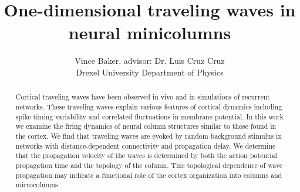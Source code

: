 \documentclass[a4paper,11pt]{article}
\title{One-dimensional traveling waves in neural minicolumns}
\author{Vince Baker, advisor: Dr. Luis Cruz Cruz\\ Drexel University Department of Physics}
\begin{document}
\maketitle

\begin{abstract}
Cortical traveling waves have been observed in vivo and in simulations of recurrent networks.
These traveling waves explain various features of cortical dynamics including spike timing variability and correlated fluctuations in membrane potential.
In this work we examine the firing dynamics of neural column structures similar to those found in the cortex.
We find that traveling waves are evoked by random background stimulus in networks with distance-dependent connectivity and propagation delay.
We determine that the propagation velocity of the waves is determined by both the action potential propagation time and the topology of the column.
This topological dependence of wave propagation may indicate a functional role of the cortex organization into columns and microcolumns.

\end{abstract}
\end{document}
